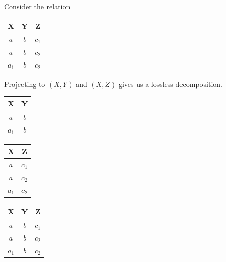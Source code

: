   \begin{example}
    \label{ex:lossy-and-lossless-decomposition}
    Consider the relation 
    \begin{table}[H]
      \centering
      \begin{tabular}{|c|c|c|}
        \hline
        \textbf{X} & \textbf{Y} & \textbf{Z} \\
        \hline
        $a$ & $b$ & $c_1$ \\
        $a$ & $b$ & $c_2$ \\
        $a_1$ & $b$ & $c_2$ \\
        \hline
      \end{tabular}
      \label{tab:ex5}
    \end{table}
    Projecting to $(X, Y)$ and $(X, Z)$ gives us a lossless decomposition. 
    \begin{table}[H]
      \centering
      \begin{minipage}{.32\textwidth}
        \centering
        \begin{tabular}{|c|c|}
          \hline
          \textbf{X} & \textbf{Y} \\
          \hline
          $a$ & $b$ \\
          $a_1$ & $b$ \\
          \hline
        \end{tabular}
        \label{tab:ex6}
      \end{minipage}
      \begin{minipage}{.32\textwidth}
        \centering
        \begin{tabular}{|c|c|}
          \hline
          \textbf{X} & \textbf{Z} \\
          \hline
          $a$ & $c_1$ \\
          $a$ & $c_2$ \\
          $a_1$ & $c_2$ \\
          \hline
        \end{tabular}
        \label{tab:ex7}
      \end{minipage}
      \begin{minipage}{.32\textwidth}
        \centering
        \begin{tabular}{|c|c|c|}
          \hline
          \textbf{X} & \textbf{Y} & \textbf{Z}\\
          \hline
          $a$ & $b$ & $c_1$ \\
          $a$ & $b$ & $c_2$ \\
          $a_1$ & $b$ & $c_2$ \\

\end{tabular}
\end{minipage}
\end{table}
\end{example}
